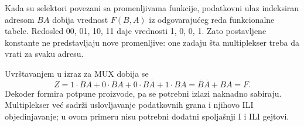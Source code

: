 
Kada su selektori povezani sa promenljivama funkcije, podatkovni ulaz indeksiran adresom \(BA\) dobija vrednost \(F(B,A)\) iz odgovarajućeg reda funkcionalne tabele. Redosled 00, 01, 10, 11 daje vrednosti 1, 0, 0, 1. Zato postavljene konstante ne predstavljaju nove promenljive: one zadaju šta multiplekser treba da vrati za svaku adresu.

Uvrštavanjem u izraz za MUX dobija se
\[
 Z=1\cdot\overline B\overline A
   +0\cdot\overline BA
   +0\cdot B\overline A+1\cdot BA
   =\overline B\overline A+BA=F.
\]
Dekoder formira potpune proizvode, pa se potrebni izlazi naknadno sabiraju. Multiplekser već sadrži uslovljavanje podatkovnih grana i njihovo ILI objedinjavanje; u ovom primeru nisu potrebni dodatni spoljašnji I i ILI gejtovi.
